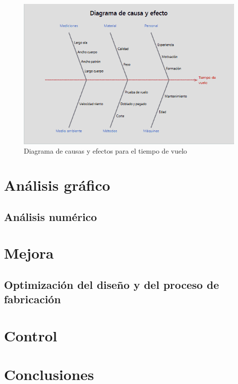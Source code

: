 \documentclass[12pt,a4paper,twoside,openright,titlepage,final]{article}
\begin{document}
\begin{figure}[htbp!]
	\centering
	\includegraphics[width=0.7\linewidth]{imagenes/Diagrama_de_causa_y_efecto}
	\caption{Diagrama de causas y efectos para el tiempo de vuelo}
	\label{fig:causa_efecto}
\end{figure}


\section{Análisis gráfico}

\subsection{Análisis numérico}

\section{Mejora}

\subsection{Optimización del diseño y del proceso de fabricación}

\section{Control}

\section{Conclusiones}
\end{document}
